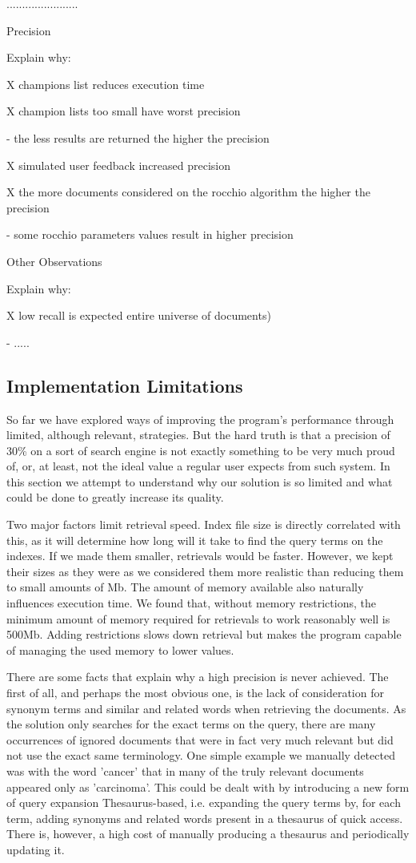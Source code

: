 \documentclass[12pt]{article}
\begin{document}
.......................

Precision

Explain why:

X champions list reduces execution time

X champion lists too small have worst precision

- the less results are returned the higher the precision

X simulated user feedback increased precision

X the more documents considered on the rocchio algorithm the higher the precision

- some rocchio parameters values result in higher precision

Other Observations

Explain why:

X low recall is expected  entire universe of documents)

- .....

\subsection{Implementation Limitations}

So far we have explored ways of improving the program's performance through
limited, although relevant, strategies.
But the hard truth is that a precision of 30\% on a sort of search engine is not
exactly something to be very much proud of, or, at least, not the ideal value 
a regular user expects from such system.
In this section we attempt to understand why our solution is so limited and 
what could be done to greatly increase its quality.

Two major factors limit retrieval speed.
Index file size is directly correlated with this, as it will determine how long
will it take to find the query terms on the indexes. 
If we made them smaller, retrievals would be faster.
However, we kept their sizes as they were as we considered them more realistic 
than reducing them to small amounts of Mb.
The amount of memory available also naturally influences execution time.
We found that, without memory restrictions, the minimum amount of memory required 
for retrievals to work reasonably well is 500Mb.
Adding restrictions slows down retrieval but makes the program capable of managing
the used memory to lower values.

There are some facts that explain why a high precision is never achieved.
The first of all, and perhaps the most obvious one, is the lack of consideration
for synonym terms and similar and related words when retrieving the documents.
As the solution only searches for the exact terms on the query, there are many
occurrences of ignored documents that were in fact very much relevant but did not
use the exact same terminology.
One simple example we manually detected was with the word 'cancer' that in many 
of the truly relevant documents appeared only as 'carcinoma'.
This could be dealt with by introducing a new form of query expansion Thesaurus-based,
i.e. expanding the query terms by, for each term, adding synonyms and related words
present in a thesaurus of quick access.
There is, however, a high cost of manually producing a thesaurus and periodically 
updating it.
\end{document}
